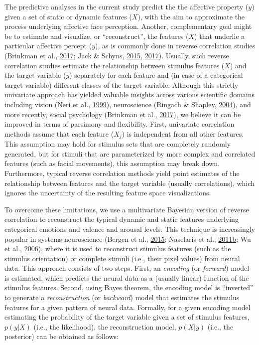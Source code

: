 \documentclass[11pt,american,a4paper,oneside,]{memoir} %
\begin{document}
The predictive analyses in the current study predict the the affective property (\(y\)) given a set of static or dynamic features (\(X\)), with the aim to approximate the process underlying affective face perception. Another, complementary goal might be to estimate and visualize, or ``reconstruct'', the features (\(X\)) that underlie a particular affective percept (\(y\)), as is commonly done in reverse correlation studies (Brinkman et al., \protect\hyperlink{ref-Brinkman2017-hg}{2017}; Jack \& Schyns, \protect\hyperlink{ref-Jack2015-sh}{2015}, \protect\hyperlink{ref-Jack2017-gt}{2017}). Usually, such reverse correlation studies estimate the relationship between stimulus features (\(X\)) and the target variable (\(y\)) separately for each feature and (in case of a categorical target variable) different classes of the target variable. Although this strictly univariate approach has yielded valuable insights across various scientific domains including vision (Neri et al., \protect\hyperlink{ref-Neri1999-rj}{1999}), neuroscience (Ringach \& Shapley, \protect\hyperlink{ref-Ringach2004-nn}{2004}), and more recently, social psychology (Brinkman et al., \protect\hyperlink{ref-Brinkman2017-hg}{2017}), we believe it can be improved in terms of parsimony and flexibility. First, univariate correlation methods assume that each feature (\(X_{j}\)) is independent from all other features. This assumption may hold for stimulus sets that are completely randomly generated, but for stimuli that are parameterized by more complex and correlated features (such as facial movements), this assumption may break down. Furthermore, typical reverse correlation methods yield point estimates of the relationship between features and the target variable (usually correlations), which ignores the uncertainty of the resulting feature space visualizations.

To overcome these limitations, we use a multivariate Bayesian version of reverse correlation to reconstruct the typical dynamic and static features underlying categorical emotions and valence and arousal levels. This technique is increasingly popular in systems neuroscience (Bergen et al., \protect\hyperlink{ref-Van_Bergen2015-kl}{2015}; Naselaris et al., \protect\hyperlink{ref-Naselaris2011-oh}{2011}\protect\hyperlink{ref-Naselaris2011-oh}{b}; Wu et al., \protect\hyperlink{ref-Wu2006-qs}{2006}), where it is used to reconstruct stimulus features (such as the stimulus orientation) or complete stimuli (i.e., their pixel values) from neural data. This approach consists of two steps. First, an \emph{encoding} (or \emph{forward}) model is estimated, which predicts the neural data as a (usually linear) function of the stimulus features. Second, using Bayes theorem, the encoding model is ``inverted'' to generate a \emph{reconstruction} (or \emph{backward}) model that estimates the stimulus features for a given pattern of neural data. Formally, for a given encoding model estimating the probability of the target variable given a set of stimulus features, \(p(y | X)\) (i.e., the likelihood), the reconstruction model, \(p(X | y)\) (i.e., the posterior) can be obtained as follows:
\end{document}
